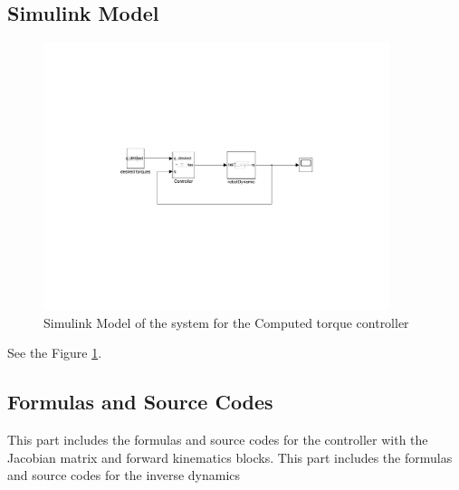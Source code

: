 \documentclass{article}
\begin{document}
\subsection{Simulink Model}
\begin{figure}[ht]
    \centering
    \includegraphics[width=0.9\textwidth]{figures/model_computed.pdf}
    \caption{Simulink Model of the system for the Computed torque controller}
    \label{fig:model_computed}
\end{figure}
See the Figure \ref{fig:model_computed}.

\subsection{Formulas and Source Codes}
This part includes the formulas and source codes for the controller with the Jacobian matrix and forward kinematics blocks.
This part includes the formulas and source codes for the inverse dynamics
\end{document}
